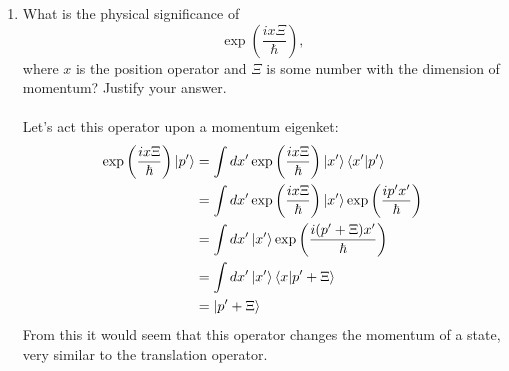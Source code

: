 \documentclass[11pt,letterpaper]{article}
\begin{document}
\begin{enumerate}
\begin{enumerate}
\begin{enumerate}
\\ \\(ii) Forming $\braket{\beta|x|\alpha}$,
\begin{align*}
\braket{\beta|x|\alpha}&=\int{dp'\braket{\beta|p'}\braket{p'|x|\alpha}}\\
&=\int{dp'\braket{\beta|p'}i\hbar\frac{\partial}{\partial p'}\braket{p'|\alpha}}
\end{align*}
Thus
$$\braket{\beta|x|\alpha} = \int{dp'\ \phi^*_\beta(p')i\hbar \frac{\partial}{\partial p'}\phi_\alpha(p')}$$
\end{enumerate}

\item What is the physical significance of 
$$\exp{\left(\frac{ix\Xi}{\hbar}\right)},$$ where $x$ is the position operator and $\Xi$ is some number with the dimension of momentum? Justify your answer.
\\ \\Let's act this operator upon a momentum eigenket:
\begin{align*}\exp{\left(\frac{ix\Xi}{\hbar}\right)}\ket {p'} &=\int{dx'\exp{\left(\frac{ix\Xi}{\hbar}\right)}\ket{x'}\braket{x'|p'}}\\
&=\int{dx'\exp{\left(\frac{ix\Xi}{\hbar}\right)}\ket {x'}\exp{\left(\frac{ip'x'}{\hbar}\right)}}\\
&=\int{dx'\ket {x'}\exp{\left(\frac{i(p'+\Xi)x'}{\hbar}\right)}}\\
&=\int{dx'\ket {x'}\braket{x|p'+\Xi}}\\
&=\ket{p'+\Xi}
\end{align*}
From this it would seem that this operator changes the momentum of a state, very similar to the translation operator.
\end{enumerate}
\end{enumerate}
\end{document}
